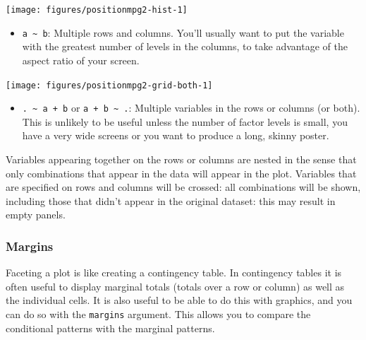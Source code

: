 \begin{flushleft}\texttt{[image: figures/positionmpg2-hist-1]} \end{flushleft}

\begin{itemize}
\itemsep1pt\parskip0pt
\item
  \texttt{a \textasciitilde{} b}: Multiple rows and columns. You'll
  usually want to put the variable with the greatest number of levels in
  the columns, to take advantage of the aspect ratio of your screen.
\end{itemize}

\begin{Shaded}
\begin{Highlighting}[]
\NormalTok{>}\StringTok{ } \StringTok{ }\StringTok{ }
\end{Highlighting}
\end{Shaded}

\begin{flushleft}\texttt{[image: figures/positionmpg2-grid-both-1]} \end{flushleft}

\begin{itemize}
\itemsep1pt\parskip0pt
\item
  \texttt{. \textasciitilde{} a + b} or
  \texttt{a + b \textasciitilde{} .}: Multiple variables in the rows or
  columns (or both). This is unlikely to be useful unless the number of
  factor levels is small, you have a very wide screens or you want to
  produce a long, skinny poster.
\end{itemize}

Variables appearing together on the rows or columns are nested in the
sense that only combinations that appear in the data will appear in the
plot. Variables that are specified on rows and columns will be crossed:
all combinations will be shown, including those that didn't appear in
the original dataset: this may result in empty panels.

\subsubsection{Margins}\label{sub:margins}

Faceting a plot is like creating a contingency table. In contingency
tables it is often useful to display marginal totals (totals over a row
or column) as well as the individual cells. It is also useful to be able
to do this with graphics, and you can do so with the \texttt{margins}
argument. This allows you to compare the conditional patterns with the
marginal patterns. 

